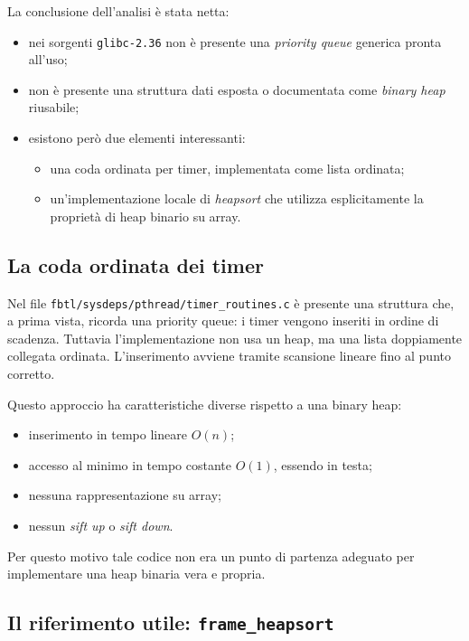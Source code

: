 \documentclass[a4paper,12pt]{article}
\begin{document}
La conclusione dell'analisi è stata netta:

\begin{itemize}[leftmargin=*]
    \item nei sorgenti \texttt{glibc-2.36} non è presente una \emph{priority queue} generica pronta all'uso;
    \item non è presente una struttura dati esposta o documentata come \emph{binary heap} riusabile;
    \item esistono però due elementi interessanti:
          \begin{itemize}
              \item una coda ordinata per timer, implementata come lista ordinata;
              \item un'implementazione locale di \emph{heapsort} che utilizza esplicitamente la proprietà di heap binario su array.
          \end{itemize}
\end{itemize}

\subsection{La coda ordinata dei timer}

Nel file \texttt{fbtl/sysdeps/pthread/timer\_routines.c} è presente una struttura che, a prima vista, ricorda una priority queue: i timer vengono inseriti in ordine di scadenza. Tuttavia l'implementazione non usa un heap, ma una lista doppiamente collegata ordinata. L'inserimento avviene tramite scansione lineare fino al punto corretto.

Questo approccio ha caratteristiche diverse rispetto a una binary heap:

\begin{itemize}[leftmargin=*]
    \item inserimento in tempo lineare \(O(n)\);
    \item accesso al minimo in tempo costante \(O(1)\), essendo in testa;
    \item nessuna rappresentazione su array;
    \item nessun \emph{sift up} o \emph{sift down}.
\end{itemize}

Per questo motivo tale codice non era un punto di partenza adeguato per implementare una heap binaria vera e propria.

\subsection{Il riferimento utile: \texttt{frame\_heapsort}}
\end{document}

